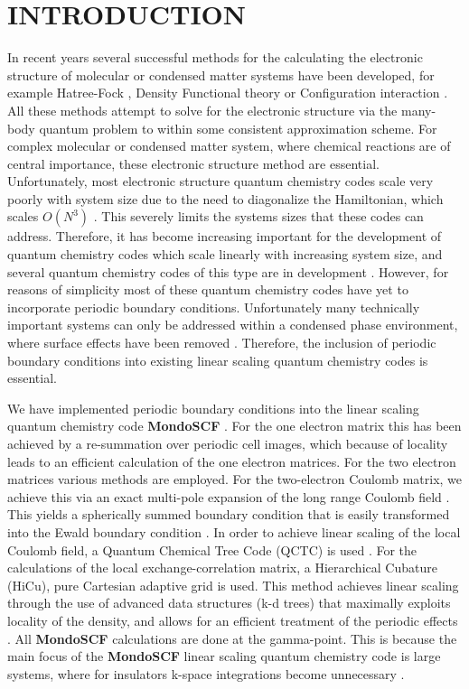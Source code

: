 \documentclass[prb,aps,nobibnotes,twocolumn,doublespace,twocolumngrid,superbib]{revtex4}
\begin{document}
\section{INTRODUCTION}
In recent years several successful methods for the calculating the electronic structure of
molecular or condensed matter systems have been developed,
for example Hatree-Fock \cite{Slater51,Roothaan51}, Density Functional theory 
\cite{Hohenberg64,KohnSham65} or Configuration interaction \cite{Choudhury79}. 
All these methods attempt to solve for the electronic structure via
the many-body quantum problem to within some consistent approximation scheme.
For complex molecular or condensed matter 
system, where chemical reactions are of central importance, these electronic structure
method are essential. Unfortunately, most electronic structure quantum chemistry codes
scale very poorly with system size due to the need to diagonalize the Hamiltonian,
which scales $O(N^3)$ 
\cite{???}.
%
%
This severely limits the systems sizes 
that these codes can address. Therefore, it has become increasing important for
the development of quantum chemistry codes which scale linearly with increasing 
system size, and several quantum chemistry codes of this type are in 
development 
\cite{Goedecker94,Challacombe96,Canning96,Briggs96,Hernandex96,Scuseria99,ANiklasson02}. 
However, for reasons of simplicity most of these quantum 
chemistry codes have yet to incorporate periodic boundary conditions.
Unfortunately many
technically important systems can only be addressed within a condensed phase environment,
where surface effects have been removed \cite{Allen90}. Therefore, the inclusion of 
periodic boundary conditions into existing linear scaling quantum chemistry
codes is essential. 

We have implemented periodic boundary conditions into the linear scaling
quantum chemistry code \textbf{MondoSCF} 
\cite{Challacombe96,Challacombe97,Challacombe99}.
For the one electron matrix this has been achieved by a re-summation
over periodic cell images, which because of locality leads to an efficient
calculation of the one electron matrices. For the two electron matrices
various methods are employed. For the two-electron Coulomb matrix,
we achieve this via an exact multi-pole expansion of the long range
Coulomb field \cite{White94,Challacombe97b}. This yields a spherically
summed boundary condition that is easily transformed into the Ewald boundary
condition \cite{Redlack72,Redlack75}. In order to achieve linear
scaling of the local Coulomb field, a Quantum Chemical Tree Code (QCTC)
is used \cite{Warren93,Warren95,Salmon94,Challacombe96A}. For the calculations of the 
local exchange-correlation matrix, a Hierarchical Cubature (HiCu), pure 
Cartesian adaptive grid
is used. This method achieves linear scaling through the use of advanced
data structures (k-d trees) that maximally exploits locality of the
density, and allows for an efficient treatment of the periodic effects
\cite{Bentley79}. All \textbf{MondoSCF} calculations are done at the gamma-point.
This is because the main focus of the \textbf{MondoSCF} linear scaling quantum chemistry
code is large systems, where for insulators k-space integrations become unnecessary 
\cite{Nunes94}.
\end{document}
